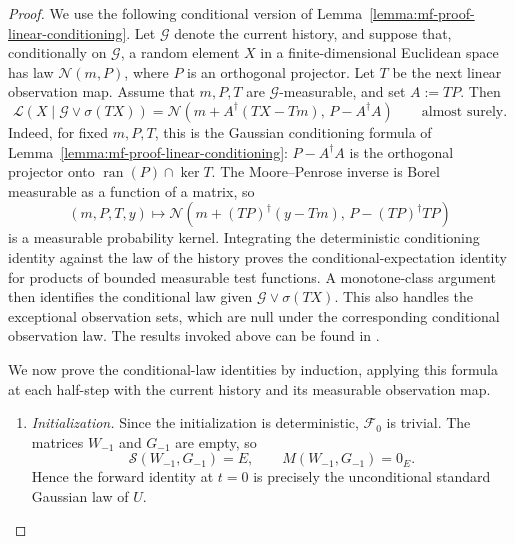 \begin{proof}
        We use the following conditional version of
        Lemma~\ref{lemma:mf-proof-linear-conditioning}.
        Let $\mathcal G$ denote the current history, and suppose that,
        conditionally on $\mathcal G$, a random element $X$ in a
        finite-dimensional Euclidean space has law $\mathcal N(m,P)$,
        where $P$ is an orthogonal projector.
        Let $T$ be the next linear observation map.
        Assume that $m,P,T$ are $\mathcal G$-measurable, and set
        $A:=TP$.
        Then
        \[
            \mathscr L(X\mid\mathcal G\vee\sigma(TX))
            =
            \mathcal N\!\left(
                m+A^\dagger(TX-Tm),\,
                P-A^\dagger A
            \right)
            \qquad\text{almost surely}.
        \]
        Indeed, for fixed $m,P,T$, this is the Gaussian conditioning
        formula of Lemma~\ref{lemma:mf-proof-linear-conditioning}:
        $P-A^\dagger A$ is the orthogonal projector onto
        $\operatorname{ran}(P)\cap\ker T$.
        The Moore--Penrose inverse is Borel measurable as a function
        of a matrix, so
        \[
            (m,P,T,y)\longmapsto
            \mathcal N\!\left(
                m+(TP)^\dagger(y-Tm),\,
                P-(TP)^\dagger TP
            \right)
        \]
        is a measurable probability kernel.
        Integrating the deterministic conditioning identity against
        the law of the history proves the conditional-expectation
        identity for products of bounded measurable test functions.
        A monotone-class argument then identifies the conditional
        law given $\mathcal G\vee\sigma(TX)$.
        This also handles the exceptional observation sets, which
        are null under the corresponding conditional observation law. 
        The results invoked above can be found in 
        \cite[Chapter~8]{kallenberg2021foundations}.

        We now prove the conditional-law identities by induction,
        applying this formula at each half-step with the current
        history and its measurable observation map.
        
        \begin{enumerate}[wide]
            \item \emph{Initialization.}
            Since the initialization is deterministic,
            $\mathcal F_0$ is trivial.
            The matrices $W_{-1}$ and $G_{-1}$ are empty, so
            \[
                \mathcal S(W_{-1},G_{-1})=E,
                \qquad
                M(W_{-1},G_{-1})=0_E.
            \]
            Hence the forward identity at $t=0$ is precisely
            the unconditional standard Gaussian law of $U$.
        

\end{enumerate}
\end{proof}
